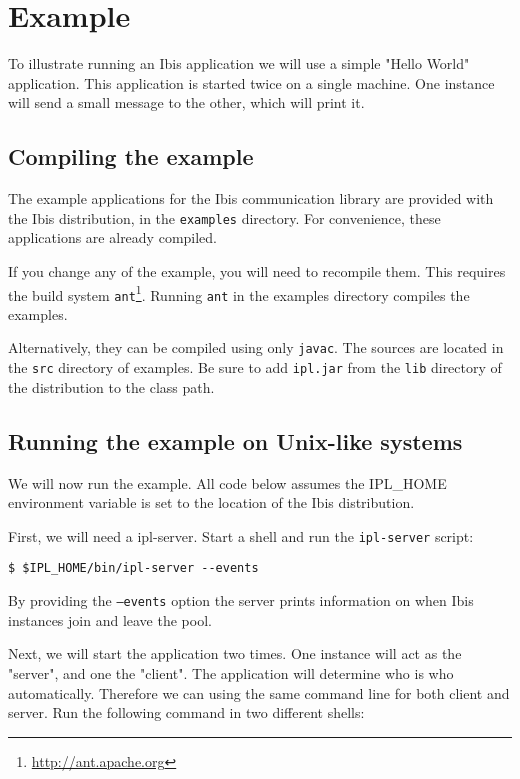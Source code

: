 \documentclass[a4paper,10pt]{article}
\begin{document}
\section{Example}

To illustrate running an Ibis application we will use a simple "Hello
World" application. This application is started twice on a single
machine. One instance will send a small message to the other, which will
print it.

\subsection{Compiling the example}

The example applications for the Ibis communication library are
provided with the Ibis distribution, in the \texttt{examples} directory.
For convenience, these applications are already compiled. 

If you change any of the example, you will need to recompile them. This 
requires the build system \texttt{ant}\footnote{\url{http://ant.apache.org}}. 
Running \texttt{ant} in the examples directory compiles the examples.

Alternatively, they can be compiled using only \texttt{javac}. The sources are
located in the \texttt{src} directory of examples. Be sure to add
\texttt{ipl.jar} 
from the \texttt{lib} directory of the distribution to the class path.

\subsection{Running the example on Unix-like systems}

We will now run the example. All code below assumes the IPL\_HOME
environment variable is set to the location of the Ibis distribution.

First, we will need a ipl-server. Start a shell and
run the \texttt{ipl-server} script:
\noindent
{\small
\begin{verbatim}
$ $IPL_HOME/bin/ipl-server --events
\end{verbatim}
}
\noindent

By providing the \texttt{--events} option the server 
prints information on when Ibis instances join and leave the pool.

Next, we will start the application two times. One instance will act as the
"server", and one the "client". The application will determine who is who
automatically. Therefore we can using the same command line for both client 
and server. Run the following command in two different shells:
\end{document}
